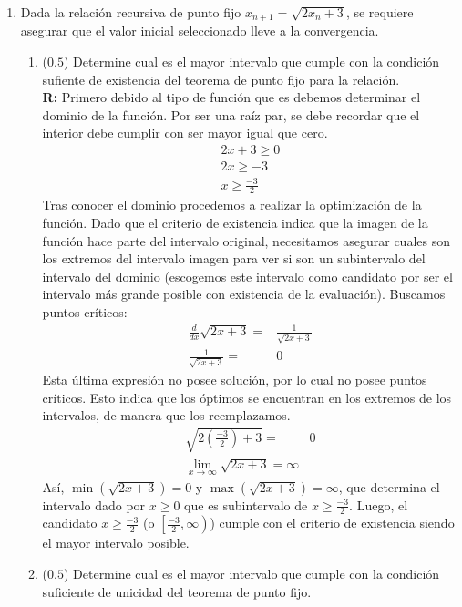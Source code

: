 \documentclass[12pt]{article}
\begin{document}
\vspace{-.5cm}
  \begin{enumerate}[leftmargin=*,widest=9]
    \item Dada la relación recursiva de punto fijo \(x_{n+1} = \sqrt{2x_n + 3}\), se requiere asegurar que el valor inicial seleccionado lleve a la convergencia.
    \begin{enumerate}[label=\alph*]
    \item (\(0.5\)) Determine cual es el mayor intervalo que cumple con la condición sufiente de existencia del teorema de punto fijo para la relación.\\
		\textbf{R:} Primero debido al tipo de función que es debemos determinar el dominio de la función. Por ser una raíz par, se debe recordar que el interior debe cumplir con ser mayor igual que cero.
		\begin{eqnarray*}
		2x + 3 \geq 0\\
		2x \geq -3\\
		x \geq \frac{-3}{2}
		\end{eqnarray*}
		Tras conocer el dominio procedemos a realizar la optimización de la función. Dado que el criterio de existencia indica que la imagen de la función hace parte del intervalo original, necesitamos asegurar cuales son los extremos del intervalo imagen para ver si son un subintervalo del intervalo del dominio (escogemos este intervalo como candidato por ser el intervalo más grande posible con existencia de la evaluación).
		Buscamos puntos críticos:
		\begin{eqnarray*}
		\frac{d}{dx}\sqrt{2x+3} =& \frac{1}{\sqrt{2x+3}}\\
		\frac{1}{\sqrt{2x+3}} = & 0
		\end{eqnarray*}
		Esta última expresión no posee solución, por lo cual no posee puntos críticos. Esto indica que los óptimos se encuentran en los extremos de los intervalos, de manera que los reemplazamos.
		\begin{eqnarray*}
		\sqrt{2\left(\frac{-3}{2}\right) + 3} =& 0\\
		\lim\limits_{x \rightarrow \infty} \sqrt{2x+3} = \infty
		\end{eqnarray*}
		Así, \(\min(\sqrt{2x+3}) = 0\) y \(\max(\sqrt{2x+3}) = \infty \), que determina el intervalo dado por \(x \geq 0\) que es subintervalo de \(x\geq \frac{-3}{2}\). Luego, el candidato \(x\geq \frac{-3}{2}\) (o \(\left[\frac{-3}{2}, \infty\right)\)) cumple con el criterio de existencia siendo el mayor intervalo posible.
    \item (\(0.5\)) Determine cual es el mayor intervalo que cumple con la condición suficiente de unicidad del teorema de punto fijo.\\

\end{enumerate}
\end{enumerate}
\end{document}

